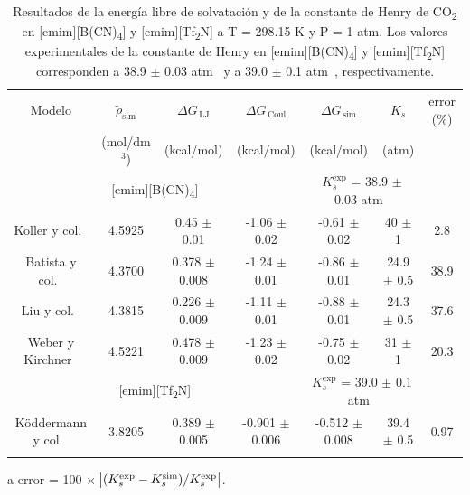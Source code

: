 \documentclass[3p,twocolumn]{elsarticle}
\begin{document}
\begin{table}[htp]
\centering
\begin{adjustbox}{width=1\textwidth}
\begin{threeparttable}
\caption{Resultados de la energía libre de solvatación y de la constante de Henry de CO\textsubscript{2} en [emim][B(CN)\textsubscript{4}] y [emim][Tf\textsubscript{2}N] a T = 298.15 K y P = 1 atm. Los valores experimentales de la constante de Henry en [emim][B(CN)\textsubscript{4}] y [emim][Tf\textsubscript{2}N] corresponden a 38.9 $\pm$ 0.03 atm~\cite{Mahurin_2010} y a 39.0 $\pm$ 0.1 atm~\cite{Finotello_2008}, respectivamente.}
\begin{tabular}{ c c c  c  c  c  c }  
\toprule
Modelo & $\tilde{\rho}_{\text{sim}}$ & $\Delta G_{\,\text{LJ}}$  & $\Delta G_{\,\text{Coul}}$  & $\Delta G_{\,\text{sim}}$ & $K_{s}$ & error (\%)\tnote{a}\\
& (mol/dm$^{3}$) & (kcal/mol) & (kcal/mol) &  (kcal/mol) & (atm)  &  \\
			\hline
			\multicolumn{4}{c}{[emim][B(CN)\textsubscript{4}]} & \multicolumn{2}{c}{\cellcolor{gray!25}$K_{s}^{\text{exp}}$ = 38.9 $\pm$ 0.03 atm~\cite{Mahurin_2010}}\\
			\hline
Koller y col.~\cite{Koller_2012} & 4.5925 & 0.45 $\pm$ 0.01 & -1.06 $\pm$ 0.02 & -0.61 $\pm$ 0.02 & 40 $\pm$ 1 & 2.8 \\
Batista y col.~\cite{Batista_2015} & 4.3700 & 0.378 $\pm$ 0.008 & -1.24 $\pm$ 0.01  & -0.86 $\pm$ 0.01 & 24.9 $\pm$ 0.5 & 38.9 \\
Liu y col.~\cite{Liu_2014} & 4.3815 & 0.226 $\pm$ 0.009 & -1.11 $\pm$ 0.01 & -0.88 $\pm$ 0.01 & 24.3 $\pm$ 0.5 & 37.6  \\
Weber y Kirchner~\cite{Weber_2016} & 4.5221 & 0.478 $\pm$ 0.009 & -1.23 $\pm$ 0.02 & -0.75 $\pm$ 0.02 & 31 $\pm$ 1 & 20.3  \\
\hline
		\multicolumn{4}{c}{[emim][Tf\textsubscript{2}N]} & \multicolumn{2}{c}{ \cellcolor{gray!25} $K_{s}^{\text{exp}}$ = 39.0 $\pm$ 0.1 atm~\cite{Finotello_2008}}\\
		\hline
 K\"{o}ddermann y col.~\cite{K_ddermann_2007} &3.8205 & 0.389 $\pm$ 0.005 & -0.901 $\pm$ 0.006& -0.512 $\pm$ 0.008 & 39.4 $\pm$ 0.5  & 0.97  \\
 \bottomrule
\label{table:henry} 
\end{tabular}
\begin{tablenotes}
\item[a] error = 100 $\times$ $\abs{(K_s^{\text{exp}} - K_s^{\text{sim}})/K_s^{\text{exp}}}$.
\end{tablenotes}
\end{threeparttable}
\end{adjustbox}
\end{table}
\end{document}
